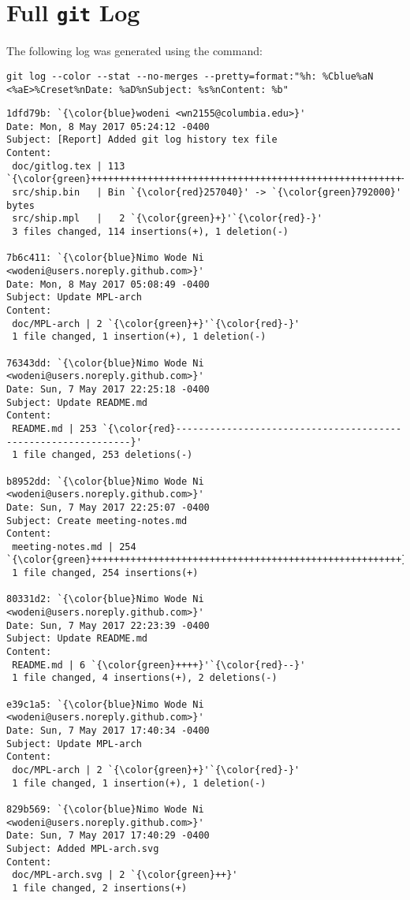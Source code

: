 \section{Full \texttt{git} Log}
The following log was generated using the command:
\begin{lstlisting}
git log --color --stat --no-merges --pretty=format:"%h: %Cblue%aN <%aE>%Creset%nDate: %aD%nSubject: %s%nContent: %b"
\end{lstlisting}
\lstset{escapeinside=`'}
\begin{lstlisting}
1dfd79b: `{\color{blue}wodeni <wn2155@columbia.edu>}'
Date: Mon, 8 May 2017 05:24:12 -0400
Subject: [Report] Added git log history tex file
Content: 
 doc/gitlog.tex | 113 `{\color{green}+++++++++++++++++++++++++++++++++++++++++++++++++++++++++}'
 src/ship.bin   | Bin `{\color{red}257040}' -> `{\color{green}792000}' bytes
 src/ship.mpl   |   2 `{\color{green}+}'`{\color{red}-}'
 3 files changed, 114 insertions(+), 1 deletion(-)

7b6c411: `{\color{blue}Nimo Wode Ni <wodeni@users.noreply.github.com>}'
Date: Mon, 8 May 2017 05:08:49 -0400
Subject: Update MPL-arch
Content: 
 doc/MPL-arch | 2 `{\color{green}+}'`{\color{red}-}'
 1 file changed, 1 insertion(+), 1 deletion(-)

76343dd: `{\color{blue}Nimo Wode Ni <wodeni@users.noreply.github.com>}'
Date: Sun, 7 May 2017 22:25:18 -0400
Subject: Update README.md
Content: 
 README.md | 253 `{\color{red}--------------------------------------------------------------}'
 1 file changed, 253 deletions(-)

b8952dd: `{\color{blue}Nimo Wode Ni <wodeni@users.noreply.github.com>}'
Date: Sun, 7 May 2017 22:25:07 -0400
Subject: Create meeting-notes.md
Content: 
 meeting-notes.md | 254 `{\color{green}+++++++++++++++++++++++++++++++++++++++++++++++++++++++}'
 1 file changed, 254 insertions(+)

80331d2: `{\color{blue}Nimo Wode Ni <wodeni@users.noreply.github.com>}'
Date: Sun, 7 May 2017 22:23:39 -0400
Subject: Update README.md
Content: 
 README.md | 6 `{\color{green}++++}'`{\color{red}--}'
 1 file changed, 4 insertions(+), 2 deletions(-)

e39c1a5: `{\color{blue}Nimo Wode Ni <wodeni@users.noreply.github.com>}'
Date: Sun, 7 May 2017 17:40:34 -0400
Subject: Update MPL-arch
Content: 
 doc/MPL-arch | 2 `{\color{green}+}'`{\color{red}-}'
 1 file changed, 1 insertion(+), 1 deletion(-)

829b569: `{\color{blue}Nimo Wode Ni <wodeni@users.noreply.github.com>}'
Date: Sun, 7 May 2017 17:40:29 -0400
Subject: Added MPL-arch.svg
Content: 
 doc/MPL-arch.svg | 2 `{\color{green}++}'
 1 file changed, 2 insertions(+)


\end{lstlisting}
